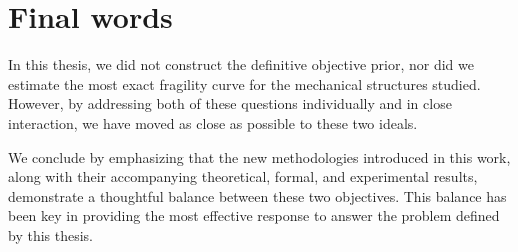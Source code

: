 \section{Final words}\label{sec:concl:final}








In this thesis, we did not construct the definitive objective prior, nor did we estimate the most exact fragility curve for the mechanical structures studied. However, by addressing both of these questions individually and in close interaction, we have moved as close as possible to these two ideals.

We conclude by emphasizing that the new methodologies introduced in this work, along with their accompanying theoretical, formal, and experimental results, demonstrate a thoughtful balance between these two objectives. This balance has been key in providing the most effective response to answer the problem defined by this thesis.

